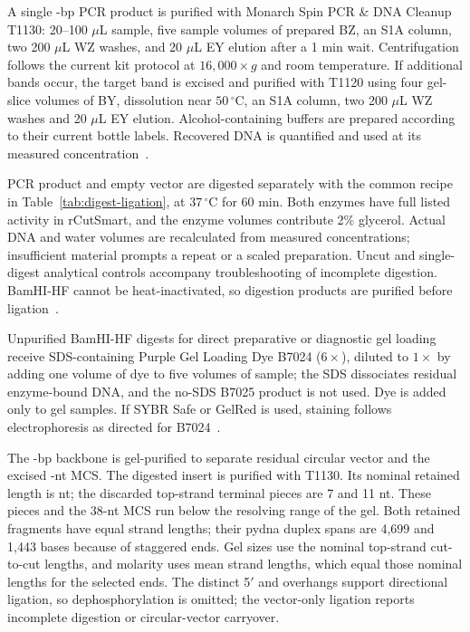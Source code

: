 A single \PCRBp{}-bp PCR product is purified with Monarch Spin PCR \& DNA Cleanup T1130: 20--100 $\mu$L sample, five sample volumes of prepared BZ, an S1A column, two 200 $\mu$L WZ washes, and 20 $\mu$L EY elution after a 1 min wait. Centrifugation follows the current kit protocol at $16{,}000\times g$ and room temperature. If additional bands occur, the target band is excised and purified with T1120 using four gel-slice volumes of BY, dissolution near $50\,^{\circ}$C, an S1A column, two 200 $\mu$L WZ washes and 20 $\mu$L EY elution. Alcohol-containing buffers are prepared according to their current bottle labels. Recovered DNA is quantified and used at its measured concentration~\cite{MethodM09,MethodM10}.

PCR product and empty vector are digested separately with the common recipe in Table~\ref{tab:digest-ligation}, at $37\,^{\circ}$C for 60 min. Both enzymes have full listed activity in rCutSmart, and the enzyme volumes contribute 2\% glycerol. Actual DNA and water volumes are recalculated from measured concentrations; insufficient material prompts a repeat or a scaled preparation. Uncut and single-digest analytical controls accompany troubleshooting of incomplete digestion. BamHI-HF cannot be heat-inactivated, so digestion products are purified before ligation~\cite{MethodM02,MethodM05,MethodM19}.

Unpurified BamHI-HF digests for direct preparative or diagnostic gel loading receive SDS-containing Purple Gel Loading Dye B7024 ($6\times$), diluted to $1\times$ by adding one volume of dye to five volumes of sample; the SDS dissociates residual enzyme-bound DNA, and the no-SDS B7025 product is not used. Dye is added only to gel samples. If SYBR Safe or GelRed is used, staining follows electrophoresis as directed for B7024~\cite{MethodM19,MethodM20}.

The \BackboneBp{}-bp backbone is gel-purified to separate residual circular vector and the excised \RemovedMCSBp{}-nt MCS. The digested insert is purified with T1130. Its nominal retained length is \InsertBp{} nt; the discarded top-strand terminal pieces are 7 and 11 nt. These pieces and the 38-nt MCS run below the resolving range of the gel. Both retained fragments have equal strand lengths; their pydna duplex spans are 4,699 and 1,443 bases because of staggered ends. Gel sizes use the nominal top-strand cut-to-cut lengths, and molarity uses mean strand lengths, which equal those nominal lengths for the selected ends. The distinct 5$'$  and  overhangs support directional ligation, so dephosphorylation is omitted; the vector-only ligation reports incomplete digestion or circular-vector carryover.

